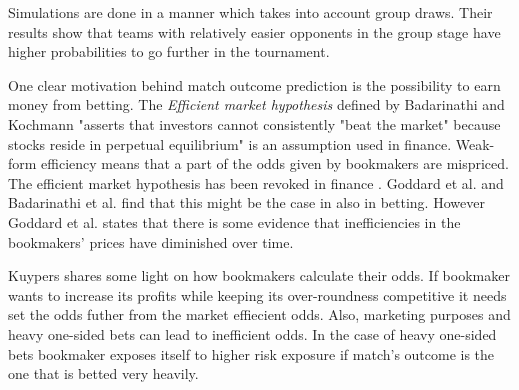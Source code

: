 Simulations \cite{leitner2010forecasting, groll2018prediction} are done in a manner which takes into account group draws. Their results show that teams with relatively easier opponents in the group stage have higher probabilities to go further in the tournament.

One clear motivation behind match outcome prediction is the possibility to earn money from betting. The \textit{Efficient market hypothesis} defined by Badarinathi and Kochmann \cite{badarinathi1996football} "asserts that investors cannot consistently "beat the market" because stocks reside in perpetual equilibrium" is an assumption used in finance. Weak-form efficiency means that a part of the odds given by bookmakers are mispriced. The efficient market hypothesis has been revoked in finance \cite{jegadeesh1993returns}. Goddard et al. and Badarinathi et al. \cite{goddard2003modelling, badarinathi1996football} find that this might be the case in also in betting. However Goddard et al. \cite{goddard2003modelling} states that there is some evidence that inefficiencies in the bookmakers’ prices have diminished over time.

Kuypers \cite{kuypers2008} shares some light on how bookmakers calculate their odds. If bookmaker wants to increase its profits while keeping its over-roundness competitive it needs set the odds futher from the market effiecient odds. Also, marketing purposes and heavy one-sided bets can lead to inefficient odds. In the case of heavy one-sided bets bookmaker exposes itself to higher risk exposure if match's outcome is the one that is betted very heavily.
